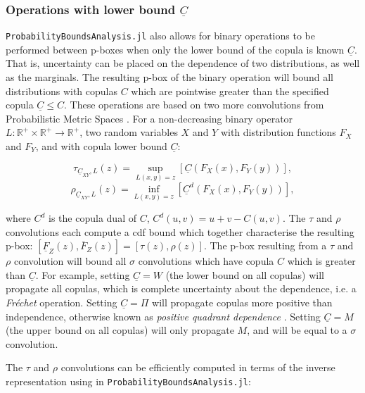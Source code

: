 \documentclass{juliacon}
\begin{document}
\subsubsection{Operations with lower bound $\underline{C}$}

\texttt{ProbabilityBoundsAnalysis.jl} also allows for binary operations to be performed between p-boxes when only the lower bound of the copula is known $\underline{C}$. That is, uncertainty can be placed on the dependence of two distributions, as well as the marginals. The resulting p-box of the binary operation will bound all distributions with copulas $C$ which are pointwise greater than the specified copula $\underline{C} \leq C$. These operations are based on two more convolutions from Probabilistic Metric Spaces \cite{schweizer2011probabilistic}. For a non-decreasing binary operator $L: \mathbb{R}^+\times \mathbb{R}^+ \to \mathbb{R}^+$, two random variables $X$ and $Y$ with distribution functions $F_X$ and $F_Y$, and with copula lower bound $\underline{C}$:

\begin{equation*}\label{taupbox}
  \tau_{\underline{C}_{XY},L}(z) = \sup_{L(x,y)=z} [\underline{C}(F_{X}(x), F_Y(y))],
\end{equation*}
\begin{equation*}\label{rhopbox}
  \rho_{\underline{C}_{XY},L}(z) = \inf_{L(x,y)=z} [\underline{C}^d(F_{X}(x), F_Y(y))],
\end{equation*}

where $C^d$ is the copula dual of $C$, $C^d(u,v) = u + v - C(u,v)$. The $\tau$ and $\rho$ convolutions each compute a cdf bound which together characterise the resulting p-box: $[\underline{F}_{Z}(z), \overline{F}_{Z}(z)] = [\tau(z), \rho(z)]$. The p-box resulting from a $\tau$ and $\rho$ convolution will bound all $\sigma$ convolutions which have copula $C$ which is greater than $\underline{C}$. For example, setting $\underline{C} = W$ (the lower bound on all copulas) will propagate all copulas, which is complete uncertainty about the dependence, i.e. a \textit{Fréchet} operation. Setting $\underline{C} = \Pi$ will propagate copulas more positive than independence, otherwise known as \textit{positive quadrant dependence} \cite{nelsen2007introduction}. Setting $\underline{C} = M$ (the upper bound on all copulas) will only propagate $M$, and will be equal to a $\sigma$ convolution. 

The $\tau$ and $\rho$ convolutions can be efficiently computed in terms of the inverse representation using in \texttt{ProbabilityBoundsAnalysis.jl}: 
\end{document}
